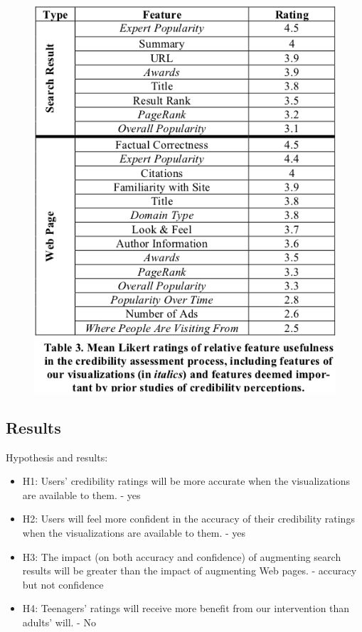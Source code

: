 \documentclass{article}
\begin{document}
\begin{figure}[!htb]
  \centering
  \includegraphics[scale=0.60]{results1.png}
\end{figure}

\subsection{Results}

Hypothesis and results:

\begin{itemize}
\item H1: Users’ credibility ratings will be more accurate when the visualizations are available to them. - yes
\item  H2: Users will feel more confident in the accuracy of their credibility ratings when the visualizations are available to them. - yes
\item H3: The impact (on both accuracy and confidence) of augmenting search results will be greater than the impact of augmenting Web pages. - accuracy but not confidence
\item H4: Teenagers’ ratings will receive more benefit from our intervention than adults’ will. - No
\end{itemize}
\end{document}
